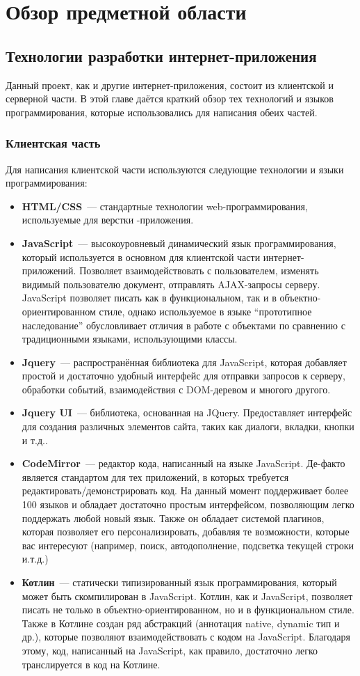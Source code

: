 \chapter{Обзор предметной области}
\section{Технологии разработки интернет-приложе\-ния}
	Данный проект, как и другие интернет-приложения,  состоит из клиентской и серверной части. В этой главе даётся краткий обзор тех технологий и языков программирования, которые использовались для написания обеих частей.
\subsection{Клиентская часть}
	Для написания клиентской части используются следующие технологии и языки программирования:
\begin{itemize}
	\item \textbf{HTML/CSS}~--- стандартные технологии web-программирования, используемые для верстки -приложения.
	\item \textbf{JavaScript}~--- высокоуровневый динамический язык программирования, который используется в основном для клиентской части интернет-приложений. Позволяет взаимодействовать с пользователем, изменять видимый пользователю документ, отправлять AJAX-запросы серверу. JavaScript позволяет писать как в функциональном, так и в объектно-ориентированном стиле, однако используемое в языке ``прототипное наследование'' обусловливает отличия в работе с объектами по сравнению с традиционными языками, использующими классы.
	\item \textbf{Jquery}~--- распространённая библиотека для JavaScript, которая добавляет простой и достаточно удобный интерфейс для отправки запросов к серверу, обработки событий, взаимодействия с DOM-деревом и многого другого.
	\item \textbf{Jquery UI}~--- библиотека, основанная на JQuery. Предоставляет интерфейс для создания различных элементов сайта, таких как диалоги, вкладки, кнопки и т.д..
	\item \textbf{CodeMirror}~--- редактор кода, написанный на языке JavaScript. Де-факто является стандартом для тех приложений, в которых требуется редактировать/демонстрировать код. На данный момент поддерживает более 100 языков и обладает достаточно простым интерфейсом, позволяющим легко поддержать любой новый язык. Также он обладает системой плагинов, которая позволяет его персонализировать, добавляя те возможности, которые вас интересуют (например, поиск, автодополнение, подсветка текущей строки и.т.д.)
	\item \textbf{Котлин}~--- статически типизированный  язык программирования, который может быть скомпилирован в JavaScript. Котлин, как и JavaScript, позволяет писать не только в объектно-ориентир\-ованном, но и в функциональном стиле. Также в Котлине создан ряд абстракций (аннотация native, dynamic тип и др.), которые позволяют взаимодействовать с кодом на JavaScript. Благодаря этому, код, написанный на JavaScript, как правило, достаточно легко транслируется в код на Котлине. 
\end{itemize}

